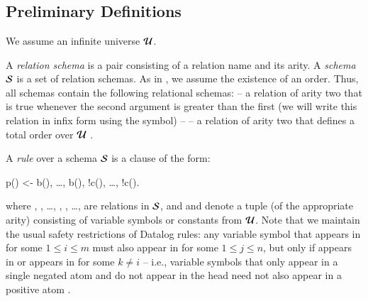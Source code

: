 \section{\large \bf \lang}
\label{sec:foundation}

\subsection{Preliminary Definitions}


We assume an infinite universe $\mathcal{U}$.

A {\em relation schema} is a pair consisting of a relation name and its arity.
A {\em schema} $\mathcal{S}$ is a set of relation schemas.   As in , we assume the existence of an order.  Thus, all schemas contain the following relational schemas:  -- a relation of arity two that is true whenever the second argument is greater than the first (we will write this relation in infix form using the \dedalus{<} symbol) --  -- a relation of arity two that defines a total order over $\mathcal{U}$ .

A {\em rule} over a schema $\mathcal{S}$ is a clause of the form:

\begin{Dedalus}
p() <- b(), \ldots, b(),
!c(), \ldots, !c().
\end{Dedalus}

where , , \ldots, ,
, \ldots,  are relations in
$\mathcal{S}$, and  and 
denote a tuple (of the appropriate arity) consisting of variable symbols or
constants from $\mathcal{U}$.  Note that we maintain the usual safety
restrictions of Datalog rules: any variable symbol  that appears in
 for some $1 \leq i \leq m$ must also appear in
 for some $1 \leq j \leq n$, but only if 
appears in  or  appears in
 for some $k \neq i$ -- i.e., variable symbols that
only appear in a single negated atom and do not appear in the head need not also
appear in a positive atom .

